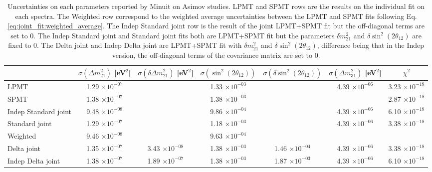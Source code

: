 \documentclass[../main.tex]{subfiles}
\begin{document}
\begin{table}[ht]
  \begin{footnotesize}
  \centering
  \begin{tabular}{l | c | c | c | c | c | c }
                                    & $\sigma(\Delta m^2_{21})$ [eV$^2$]  & $\sigma(\delta \Delta m^2_{21})$ [eV$^2$]& $\sigma(\sin^2(2\theta_{12}))$  & $\sigma(\delta \sin^2(2\theta_{12}))$ & $\sigma(\Delta m^2_{31})$ [eV$^2$] & $\chi^2$ \\
                                    \hline
  LPMT                                 & 1.29 $\times 10^{-07}$   &                          & 1.33 $\times 10^{-03}$   &               & 4.39 $\times 10^{-06}$   & 3.23 $\times 10^{-18}$ \\
  SPMT                                 & 1.38 $\times 10^{-07}$   &                          & 1.38 $\times 10^{-03}$   &               &                          & 2.87 $\times 10^{-18}$ \\
  Indep Standard joint                 & 9.48 $\times 10^{-08}$   &                          & 9.86 $\times 10^{-04}$   &               & 4.39 $\times 10^{-06}$   & 6.10 $\times 10^{-18}$ \\
  Standard joint                       & 1.29 $\times 10^{-07}$   &                          & 1.18 $\times 10^{-03}$   &               & 4.39 $\times 10^{-06}$   & 3.38 $\times 10^{-18}$ \\
  Weighted                             & 9.46 $\times 10^{-08}$   &                          & 9.63 $\times 10^{-04}$   &               &               & \\
  \hline
  Delta joint                          & 1.35 $\times 10^{-07}$   & 3.43 $\times 10^{-08}$   & 1.38 $\times 10^{-03}$   & 1.46 $\times 10^{-04}$   & 4.39 $\times 10^{-06}$   & 3.38 $\times 10^{-18}$ \\
  Indep Delta joint                    & 1.38 $\times 10^{-07}$   & 1.89 $\times 10^{-07}$   & 1.38 $\times 10^{-03}$   & 1.87 $\times 10^{-03}$   & 4.39 $\times 10^{-06}$   & 6.10 $\times 10^{-18}$ \\
  \hline
  \end{tabular}
  \end{footnotesize}
  \caption{Uncertainties on each parameters reported by Minuit on Asimov studies. LPMT and SPMT rows are the results on the individual fit on each spectra. The Weighted row correspond to the weighted average uncertainties between the LPMT and SPMT fits following Eq. \ref{eq:joint_fit:weighted_average}. The Indep Standard joint row is the result of the joint LPMT+SPMT fit but the off-diagonal terms are set to 0. The Indep Standard joint and Standard joint fits both are LPMT+SPMT fit but the parameters $\delta m^2_{21}$ and $\delta \sin^2(2 \theta_{12})$ are fixed to 0. The Delta joint and Indep Delta joint are LPMT+SPMT fit with $\delta m^2_{21}$ and $\delta \sin^2(2 \theta_{12})$, difference being that in the Indep version, the off-diagonal terms of the covariance matrix are set to 0.}
  \label{tab:joint_fit:asimov_results}

\end{table}
\end{document}
